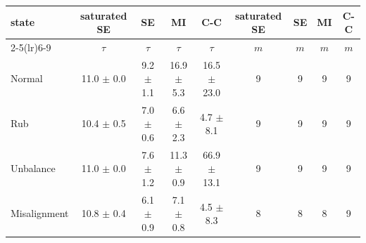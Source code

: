 \begin{tabular}{lcccccccc}
\toprule
state & saturated SE & SE & MI & C-C & saturated SE & SE & MI & C-C \\
\cmidrule(lr){2-5}\cmidrule(lr){6-9}
 & $\tau$ & $\tau$ & $\tau$ & $\tau$ & $m$ & $m$ & $m$ & $m$ \\
\midrule
Normal & 11.0 $\pm$ 0.0 & 9.2 $\pm$ 1.1 & 16.9 $\pm$ 5.3 & 16.5 $\pm$ 23.0 & 9 & 9 & 9 & 9 \\
Rub & 10.4 $\pm$ 0.5 & 7.0 $\pm$ 0.6 & 6.6 $\pm$ 2.3 & 4.7 $\pm$ 8.1 & 9 & 9 & 9 & 9 \\
Unbalance & 11.0 $\pm$ 0.0 & 7.6 $\pm$ 1.2 & 11.3 $\pm$ 0.9 & 66.9 $\pm$ 13.1 & 9 & 9 & 9 & 9 \\
Misalignment & 10.8 $\pm$ 0.4 & 6.1 $\pm$ 0.9 & 7.1 $\pm$ 0.8 & 4.5 $\pm$ 8.3 & 8 & 8 & 8 & 9 \\
\bottomrule
\end{tabular}
